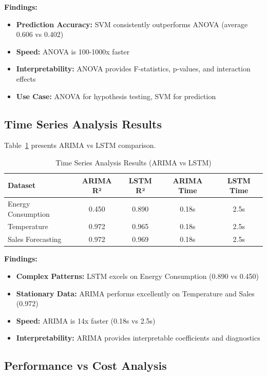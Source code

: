 \documentclass[11pt,a4paper]{article}
\begin{document}
\textbf{Findings:}
\begin{itemize}
    \item \textbf{Prediction Accuracy:} SVM consistently outperforms ANOVA (average 0.606 vs 0.402)
    \item \textbf{Speed:} ANOVA is 100-1000x faster
    \item \textbf{Interpretability:} ANOVA provides F-statistics, p-values, and interaction effects
    \item \textbf{Use Case:} ANOVA for hypothesis testing, SVM for prediction
\end{itemize}

\subsection{Time Series Analysis Results}

Table~\ref{tab:timeseries_results} presents ARIMA vs LSTM comparison.

\begin{table}[h]
\centering
\begin{tabular}{lcccc}
\toprule
\textbf{Dataset} & \textbf{ARIMA R²} & \textbf{LSTM R²} & \textbf{ARIMA Time} & \textbf{LSTM Time} \\
\midrule
Energy Consumption & 0.450 & \textcolor{dlcolor}{0.890} & 0.18s & 2.5s \\
Temperature & \textcolor{statcolor}{0.972} & 0.965 & 0.18s & 2.5s \\
Sales Forecasting & \textcolor{statcolor}{0.972} & 0.969 & 0.18s & 2.5s \\
\bottomrule
\end{tabular}
\caption{Time Series Analysis Results (ARIMA vs LSTM)}
\label{tab:timeseries_results}
\end{table}

\textbf{Findings:}
\begin{itemize}
    \item \textbf{Complex Patterns:} LSTM excels on Energy Consumption (0.890 vs 0.450)
    \item \textbf{Stationary Data:} ARIMA performs excellently on Temperature and Sales (0.972)
    \item \textbf{Speed:} ARIMA is 14x faster (0.18s vs 2.5s)
    \item \textbf{Interpretability:} ARIMA provides interpretable coefficients and diagnostics
\end{itemize}

\subsection{Performance vs Cost Analysis}
\end{document}
